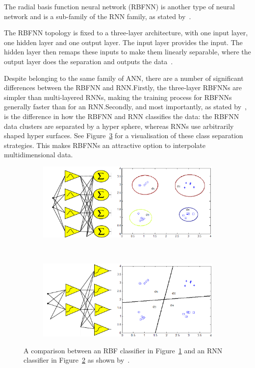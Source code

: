 The radial basis function neural network (RBFNN) is another type of neural network and is a sub-family of the RNN family, as stated by~\cite{wilamowski1996implementation}. 

The RBFNN topology is fixed to a three-layer architecture, with one input layer, one hidden layer and one output layer. The input layer provides the input. The hidden layer then remaps these inputs to make them linearly separable, where the output layer does the separation and outputs the data~\citep{xie2011comparison}.  

Despite belonging to the same family of ANN, there are a number of significant differences between the RBFNN and RNN.\@ Firstly, the three-layer RBFNNs are simpler than multi-layered RNNs, making the training process for RBFNNs generally faster than for an RNN.\@ Secondly, and most importantly, as stated by~\citeauthor{xie2011comparison}, is the difference in how the RBFNN and RNN classifies the data: the RBFNN data clusters are separated by a hyper sphere, whereas RNNs use arbitrarily shaped hyper surfaces. See Figure~\ref{fig:chap2-classifier} for a visualisation of these class separation strategies. This makes RBFNNs an attractive option to interpolate multidimensional data.

\begin{figure}
  \centering
  \begin{subfigure}{0.48\textwidth}
    \includegraphics[width=\textwidth]{figures/chapter2/rbf_class}
    \caption{}
\label{fig:chap2-rbf-classifier}
  \end{subfigure}
  ~
  \begin{subfigure}{0.48\textwidth}
    \includegraphics[width=\textwidth]{figures/chapter2/rnn_class}
    \caption{}
\label{fig:chap2-rnn-classifier}
  \end{subfigure}
  \caption[Comparison between the RBF and RNN classifiers. ]{A comparison between an RBF classifier in Figure~\ref{fig:chap2-rbf-classifier} and an RNN classifier in Figure~\ref{fig:chap2-rnn-classifier} as shown by~\cite{xie2011comparison}. }
\label{fig:chap2-classifier}
\end{figure}

